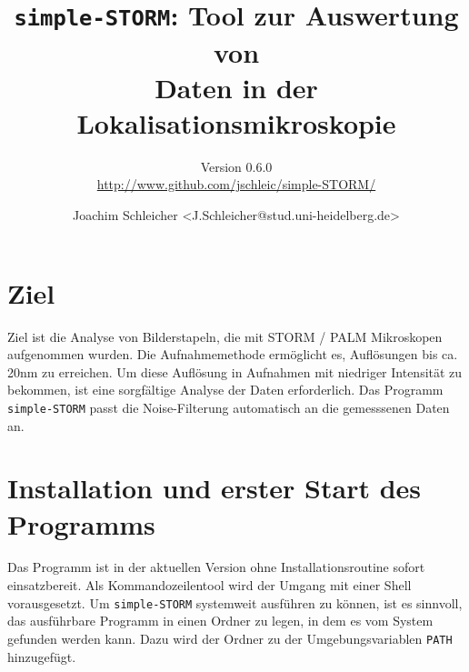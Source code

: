 \documentclass[DIV15,a4paper]{scrartcl}
\begin{document}
\title{\texttt{simple-STORM}: Tool zur Auswertung von\\ Daten in der Lokalisationsmikroskopie}
\subtitle{Version 0.6.0 \\ \url{http://www.github.com/jschleic/simple-STORM/}}
\author{Joachim Schleicher <J.Schleicher@stud.uni-heidelberg.de>}
\maketitle
\thispagestyle{empty}

\section{Ziel}
Ziel ist die Analyse von Bilderstapeln, die mit STORM / PALM Mikroskopen 
aufgenommen wurden.
Die Aufnahmemethode ermöglicht es, Auflösungen bis ca. 20nm zu erreichen.
Um diese Auflösung in Aufnahmen mit niedriger Intensität zu bekommen, ist
eine sorgfältige Analyse der Daten erforderlich.
Das Programm \texttt{simple-STORM} passt die Noise-Filterung automatisch an 
die gemesssenen Daten an. 

\section{Installation und erster Start des Programms}
Das Programm ist in der aktuellen Version ohne Installationsroutine sofort einsatzbereit.
Als Kommandozeilentool wird der Umgang mit einer Shell vorausgesetzt.
Um \texttt{simple-STORM} systemweit ausführen zu können, ist es sinnvoll, 
das ausführbare Programm 
in einen Ordner zu legen, in dem es vom System gefunden werden kann.
Dazu wird der Ordner zu der Umgebungsvariablen \texttt{PATH} hinzugefügt.

\end{document}
